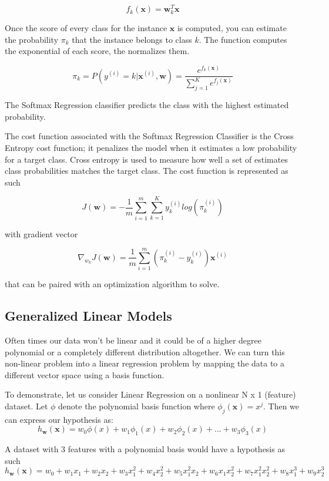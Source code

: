 \documentclass[12pt]{article}
\begin{document}
            $$ f_k(\boldsymbol{x}) = \boldsymbol{w}^T_k\boldsymbol{x} $$

            Once the score of every class for the instance $\boldsymbol{x}$ is computed, you can estimate the probability $\pi_k$ that the instance belongs to class $k$. The function computes the exponential of each score, 
            the normalizes them.

            $$ \pi_k = P(y^{(i)} = k | \boldsymbol{x}^{(i)}, \boldsymbol{w}) = \frac{e^{f_k(\boldsymbol{x})}}{\sum_{j=1}^K e^{f_j(\boldsymbol{x})}} $$

            The Softmax Regression classifier predicts the class with the highest estimated probability.

            The cost function associated with the Softmax Regression Classifier is the Cross Entropy cost function; it penalizes the model when it estimates a low probability for a target class. Cross entropy is used to
            measure how well a set of estimates class probabilities matches the target class. The cost function is represented as such

            $$ J(\boldsymbol{w}) = -\frac{1}{m}\sum_{i=1}^m \sum_{k=1}^K y_k^{(i)} log(\pi^{(i)}_k) $$

            with gradient vector

            $$ \nabla_{w_k} J(\boldsymbol{w}) = \frac{1}{m}\sum_{i=1}^m(\pi^{(i)}_k - y^{(i)}_k)\boldsymbol{x}^{(i)} $$

            that can be paired with an optimization algorithm to solve.

    \subsection{Generalized Linear Models}
        Often times our data won't be linear and it could be of a higher degree polynomial or a completely different distribution altogether. We can turn this non-linear problem into 
        a linear regression problem by mapping the data to a different vector space using a basis function.

        To demonstrate, let us consider Linear Regression on a nonlinear N x 1 (feature) dataset. Let $\phi$ denote the polynomial basis function where
        $\phi_j(\boldsymbol{x}) = x^j$. Then we can express our hypothesis as: 
        $$ h_{\boldsymbol{w}}(\boldsymbol{x}) = w_0\phi(x) + w_1\phi_1(x) + w_2\phi_2(x) + ... + w_3\phi_3(x) $$

        A dataset with 3 features with a polynomial basis would have a hypothesis as such
        $$ h_{\boldsymbol{w}}(\boldsymbol{x}) = w_0 + w_1x_1 + w_2x_2 + w_3x_1^2 + w_4x_2^2 + w_5x_1^2x_2 + w_6x_1x_2^2 + w_7x_1^2x_2^2 + w_8x_1^3 + w_9x_2^3 $$
\end{document}
